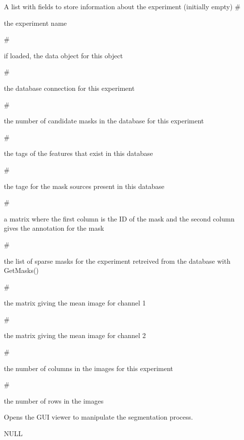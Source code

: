 \documentclass[a4paper]{book}
\begin{document}
\begin{Value}
A list with fields to store information about the
experiment (initially empty) \#\begin{ldescription}
\item[\code{name}] the experiment
name\end{ldescription}
\#\begin{ldescription}
\item[\code{data}] if loaded, the data object for this
object\end{ldescription}
\#\begin{ldescription}
\item[\code{db}] the database connection for this
experiment\end{ldescription}
\#\begin{ldescription}
\item[\code{nmasks}] the number of candidate masks
in the database for this experiment\end{ldescription}
\#\begin{ldescription}
\item[\code{features}] the
tags of the features that exist in this database
\end{ldescription}
\#\begin{ldescription}
\item[\code{sources}] the tage for the mask sources present in
this database\end{ldescription}
\#\begin{ldescription}
\item[\code{selmat}] a matrix where the first
column is the ID of the mask and the second column gives
the annotation for the mask\end{ldescription}
\#\begin{ldescription}
\item[\code{sms}] the list of
sparse masks for the experiment retreived from the
database with GetMasks()\end{ldescription}
\#\begin{ldescription}
\item[\code{mimg1}] the matrix giving
the mean image for channel 1\end{ldescription}
\#\begin{ldescription}
\item[\code{mimg2}] the matrix
giving the mean image for channel 2\end{ldescription}
\#\begin{ldescription}
\item[\code{nx}] the
number of columns in the images for this experiment
\end{ldescription}
\#\begin{ldescription}
\item[\code{ny}] the number of rows in the images\end{ldescription}
Opens the
GUI viewer to manipulate the segmentation process.

NULL
\end{Value}
\printindex{}
\end{document}
